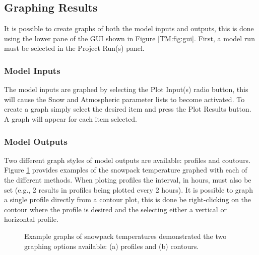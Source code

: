 \subsection{Graphing Results}
It is possible to create graphs of both the model inputs and outputs, this is done using the lower pane of the GUI shown in Figure \ref{TM:fig:gui}.  First, a model run must be selected in the Project Run(s) panel.

\subsubsection{Model Inputs}
The model inputs are graphed by selecting the Plot Input(s) radio button, this will cause the Snow and Atmospheric parameter lists to become activated. To create a graph simply select the desired item and press the Plot Results button. A graph will appear for each item selected. 

\subsubsection{Model Outputs}
Two different graph styles of model outputs are available: profiles and coutours.  Figure \ref{TM:fig:example} provides examples of the snowpack temperature graphed with each of the different methods.  When ploting profiles the interval, in hours, must also be set (e.g., 2 results in profiles being plotted every 2 hours). It is possible to graph a single profile directly from a contour plot, this is done be right-clicking on the contour where the profile is desired and the selecting either a vertical or horizontal profile. 

\begin{figure}[ht!]\centering
{}\quad
{}\quad
\caption{Example graphs of snowpack temperatures demonstrated the two graphing options available: (a) profiles and (b) contours.}
\label{TM:fig:example}
\end{figure}

